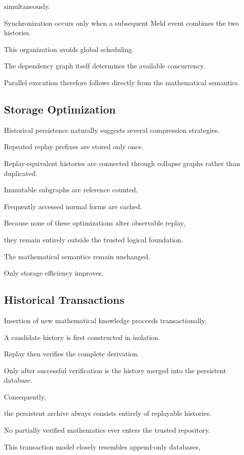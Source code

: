 \documentclass[12pt,oneside]{article}
\theoremstyle{definition}
\theoremstyle{remark}
\begin{document}
simultaneously.

Synchronization occurs only when a subsequent Meld event combines the two
histories.

This organization avoids global scheduling.

The dependency graph itself determines the available concurrency.

Parallel execution therefore follows directly from the mathematical semantics.

\subsection{Storage Optimization}

Historical persistence naturally suggests several compression strategies.

Repeated replay prefixes are stored only once.

Replay-equivalent histories are connected through collapse graphs rather than
duplicated.

Immutable subgraphs are reference counted.

Frequently accessed normal forms are cached.

Because none of these optimizations alter observable replay,

they remain entirely outside the trusted logical foundation.

The mathematical semantics remain unchanged.

Only storage efficiency improves.

\subsection{Historical Transactions}

Insertion of new mathematical knowledge proceeds transactionally.

A candidate history is first constructed in isolation.

Replay then verifies the complete derivation.

Only after successful verification is the history merged into the persistent
database.

Consequently,

the persistent archive always consists entirely of replayable histories.

No partially verified mathematics ever enters the trusted repository.

This transaction model closely resembles append-only databases,
\end{document}

